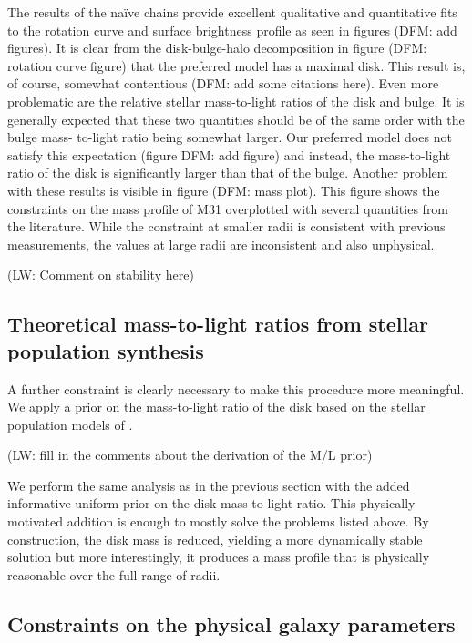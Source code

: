 \documentclass[preprint,12pt]{aastex}
\begin{document}
The results of the na\"ive chains provide excellent qualitative and
quantitative fits to the rotation curve and surface brightness profile
as seen in figures (DFM: add figures). It is clear from the disk-bulge-halo
decomposition in figure (DFM: rotation curve figure) that the preferred
model has a maximal disk. This result is, of course, somewhat contentious
(DFM: add some citations here). Even more problematic are the relative
stellar mass-to-light ratios of the disk and bulge. It is generally expected
that these two quantities should be of the same order with the bulge mass-
to-light ratio being somewhat larger. Our preferred model does not satisfy
this expectation (figure DFM: add figure) and instead, the mass-to-light
ratio of the disk is significantly larger than that of the bulge. Another
problem with these results is visible in figure (DFM: mass plot). This
figure shows the constraints on the mass profile of M31 overplotted with
several quantities from the literature. While the constraint at smaller
radii is consistent with previous measurements, the values at large radii
are inconsistent and also unphysical.

(LW: Comment on stability here)


\subsection{Theoretical mass-to-light ratios from stellar population
    synthesis}

A further constraint is clearly necessary to make this procedure more
meaningful. We apply a prior on the mass-to-light ratio of the disk based
on the stellar population models of \citet{Bell:2003}.

(LW: fill in the comments about the derivation of the M/L prior)

We perform the same analysis as in the previous section with the added
informative uniform prior on the disk mass-to-light ratio. This physically
motivated addition is enough to mostly solve the problems listed above. By
construction, the disk mass is reduced, yielding a more dynamically stable
solution but more interestingly, it produces a mass profile that is physically
reasonable over the full range of radii.

\subsection{Constraints on the physical galaxy parameters}
\end{document}
